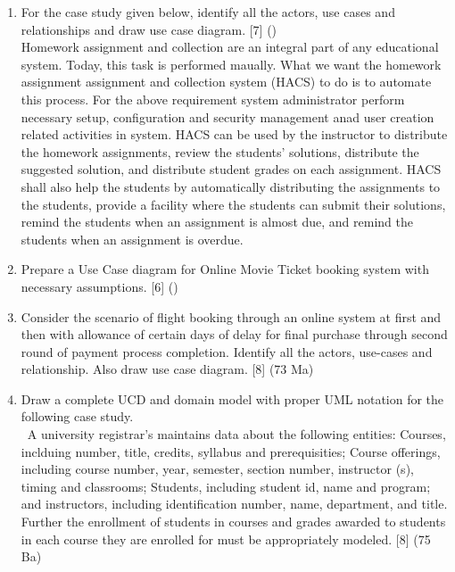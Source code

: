 \documentclass[12pt]{article}
\newcommand{\enter}{\\\textcolor{white}{1}}
\begin{document}
\begin{enumerate}
      \item For the case study given below, identify all the actors, use cases and relationships and draw use case diagram. \hfill [7] ()\\
        Homework assignment and collection are an integral part of any educational system. Today, this task is performed maually. What we want the homework assignment assignment and collection system (HACS) to do is to automate this process. For the above requirement system administrator perform necessary setup, configuration and security management anad user creation related activities in system. HACS can be used by the instructor to distribute the homework assignments, review the students' solutions, distribute the suggested solution, and distribute student grades on each assignment. HACS shall also help the students by automatically distributing the assignments to the students, provide a facility where the students can submit their solutions, remind the students when an assignment is almost due, and remind the students when an assignment is overdue.

      \item Prepare a Use Case diagram for Online Movie Ticket booking system with necessary assumptions. \hfill [6] ()

      \item Consider the scenario of flight booking through an online system at first and then with allowance of certain days of delay for final purchase through second round of payment process completion. Identify all the actors, use-cases and relationship. Also draw use case diagram. \hfill [8] (73 Ma)

      \item Draw a complete UCD and domain model with proper UML notation for the following case study.
        \enter A university registrar's maintains data about the following entities: Courses, inclduing number, title, credits, syllabus and prerequisities; Course offerings, including course number, year, semester, section number, instructor (s), timing and classrooms; Students, including student id, name and program; and instructors, including identification number, name, department, and title. Further the enrollment of students in courses and grades awarded to students in each course they are enrolled for must be appropriately modeled. \hfill [8] (75 Ba)
    \end{enumerate}
\end{document}
